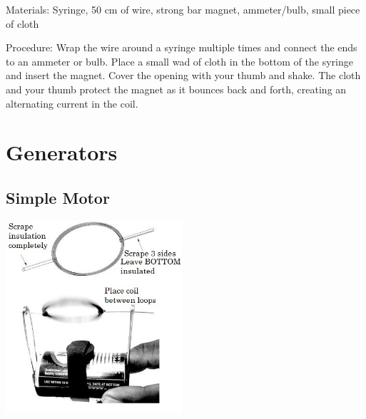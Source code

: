 \begin{multicols}{2}
\begin{description*}
\item[Materials:]{Syringe, 50 cm of wire, strong bar magnet, ammeter/bulb, small piece of cloth}
\item[Procedure:]{Wrap the wire around a syringe multiple times and connect the ends to an ammeter or bulb. Place a small wad of cloth in the bottom of the syringe and insert the magnet. Cover the opening with your thumb and shake. The cloth and your thumb protect the magnet as it bounces back and forth, creating an alternating current in the coil.}
\end{description*}

\columnbreak


\section*{Generators} 


\subsection{Simple Motor} 

\begin{center}
\includegraphics[width=0.49\textwidth]{./img/simple-motor-final.jpg}
\end{center}


\end{multicols}
